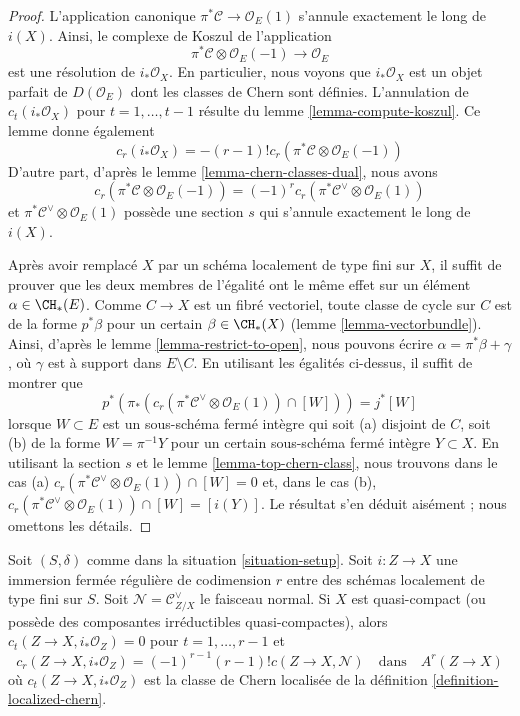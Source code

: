 \begin{proof}
L'application canonique $\pi^*\mathcal{C} \to \mathcal{O}_E(1)$ s'annule
exactement le long de $i(X)$. Ainsi, le complexe de Koszul de l'application
$$
\pi^*\mathcal{C} \otimes \mathcal{O}_E(-1) \to \mathcal{O}_E
$$
est une résolution de $i_*\mathcal{O}_X$. En particulier, nous voyons que
$i_*\mathcal{O}_X$ est un objet parfait de $D(\mathcal{O}_E)$
dont les classes de Chern sont définies. L'annulation de $c_t(i_*\mathcal{O}_X)$
pour $t = 1, \ldots, t - 1$ résulte du lemme \ref{lemma-compute-koszul}.
Ce lemme donne également
$$
c_r(i_*\mathcal{O}_X) = - (r - 1)!
c_r(\pi^*\mathcal{C} \otimes \mathcal{O}_E(-1))
$$
D'autre part, d'après le lemme \ref{lemma-chern-classes-dual}, nous avons
$$
c_r(\pi^*\mathcal{C} \otimes \mathcal{O}_E(-1)) =
(-1)^r c_r(\pi^*\mathcal{C}^\vee \otimes \mathcal{O}_E(1))
$$
et $\pi^*\mathcal{C}^\vee \otimes \mathcal{O}_E(1)$ possède une section $s$
qui s'annule exactement le long de $i(X)$.

\medskip\noindent
Après avoir remplacé $X$ par un schéma localement de type fini sur $X$,
il suffit de prouver que les deux membres de l'égalité ont le
même effet sur un élément $\alpha \in \CH_*(E)$. Comme $C \to X$
est un fibré vectoriel, toute classe de cycle sur $C$ est de la forme $p^*\beta$
pour un certain $\beta \in \CH_*(X)$ (lemme \ref{lemma-vectorbundle}).
Ainsi, d'après le lemme \ref{lemma-restrict-to-open},
nous pouvons écrire $\alpha = \pi^*\beta + \gamma$, où $\gamma$
est à support dans $E \setminus C$. En utilisant les égalités ci-dessus,
il suffit de montrer que
$$
p^*(\pi_*(c_r(\pi^*\mathcal{C}^\vee \otimes \mathcal{O}_E(1)) \cap [W])) =
j^*[W]
$$
lorsque $W \subset E$ est un sous-schéma fermé intègre qui
soit (a) disjoint de $C$, soit (b) de la forme $W = \pi^{-1}Y$
pour un certain sous-schéma fermé intègre $Y \subset X$.
En utilisant la section $s$ et le lemme \ref{lemma-top-chern-class}, nous trouvons
dans le cas (a) $c_r(\pi^*\mathcal{C}^\vee \otimes \mathcal{O}_E(1)) \cap [W] = 0$
et, dans le cas (b),
$c_r(\pi^*\mathcal{C}^\vee \otimes \mathcal{O}_E(1)) \cap [W] = [i(Y)]$.
Le résultat s'en déduit aisément ; nous omettons les détails.
\end{proof}

\begin{lemma}
\label{lemma-agreement-with-loc-chern}
Soit $(S, \delta)$ comme dans la situation \ref{situation-setup}. Soit $i : Z \to X$
une immersion fermée régulière de codimension $r$
entre des schémas localement de type fini sur $S$.
Soit $\mathcal{N} = \mathcal{C}_{Z/X}^\vee$ le faisceau normal. Si $X$
est quasi-compact (ou possède des composantes irréductibles quasi-compactes), alors
$c_t(Z \to X, i_*\mathcal{O}_Z) = 0$ pour $t = 1, \ldots, r - 1$ et
$$
c_r(Z \to X, i_*\mathcal{O}_Z) = (-1)^{r - 1} (r - 1)! c(Z \to X, \mathcal{N})
\quad\text{dans}\quad
A^r(Z \to X)
$$
où $c_t(Z \to X, i_*\mathcal{O}_Z)$
est la classe de Chern localisée
de la définition \ref{definition-localized-chern}.
\end{lemma}


